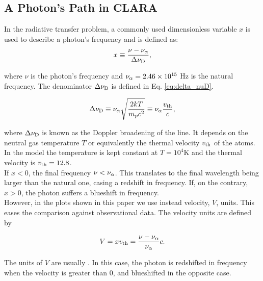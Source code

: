 \documentclass[twocolappendix]{latex/emulateapj}
\begin{document}
\subsection{A \lya Photon's Path in CLARA}
\label{subsec:photons_path_clara}

In the \lya radiative transfer problem, a commonly used dimensionless variable $x$ is used to describe a photon's frequency and is defined as:\\

\begin{equation}
	\label{eq:x_freq}
	x \equiv \frac{\nu -\nu_{\rm \alpha}}{\Delta\nu_{\rm D}},
\end{equation} 

where $\nu$ is the photon's frequency and $\nu_{\rm \alpha} = 2.46\times 10^{15}$ Hz is the \lya natural frequency. The denominator $\Delta\nu_{\rm D}$ is defined in Eq. \ref{eq:delta_nuD}.

\begin{equation}
	\label{eq:delta_nuD}
	\Delta\nu_{\rm D} \equiv \nu_{\rm \alpha}\sqrt{\frac{2kT}{m_pc^2}} \equiv \nu_{\rm \alpha} \frac{v_{\rm th}}{c},
\end{equation} 

where $\Delta\nu_{\rm D}$ is known as the Doppler broadening of the \lya line. It depends on the neutral gas temperature $T$ or equivalently the thermal velocity $v_{\rm th}$ of the atoms. In the model the temperature is kept constant at $T=10^4$K and the thermal velocity is $v_{\rm th}=12.8$\kms. \\

If $x < 0$, the final frequency $\nu < \nu_{\rm \alpha}$. This translates to the final wavelength being larger than the \lya natural one, casing a redshift in frequency. If, on the contrary, $x > 0$, the photon suffers a blueshift in frequency. \\

However, in the plots shown in this paper we use instead velocity, $V$, units. This eases the comparison against observational data. The velocity units are defined by

\begin{equation}
	\label{eq:V}
	V = xv_{\rm th} = \frac{\nu -\nu_{\rm \alpha}}{\nu_{\rm \alpha}}c.
\end{equation}

The units of $V$ are usually \kms. In this case, the photon is redshifted in frequency when the velocity is greater than 0, and blueshifted in the opposite case. \\
\end{document}
